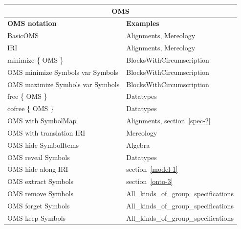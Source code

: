 \documentclass[10pt,fleqn,final]{scrreprt}
\begin{document}
\begin{tabular}{|l|l|}\hline
\multicolumn{2}{|c|}{\textbf{OMS}}\\\hline
\textbf{OMS notation} & \textbf{Examples} \\\hline
BasicOMS  & Alignments, Mereology \\\hline
IRI  & Alignments, Mereology \\\hline
minimize \{ OMS \}  & BlocksWithCircumscription \\\hline
OMS minimize Symbols var Symbols  & BlocksWithCircumscription \\\hline
OMS maximize Symbols var Symbols  & BlocksWithCircumscription \\\hline
free \{ OMS \} & Datatypes \\\hline
cofree \{ OMS \} & Datatypes \\\hline
OMS with SymbolMap  & Alignments,  section~\ref{spec-2} \\\hline
OMS with translation IRI  & Mereology \\\hline
OMS hide SymbolItems  &  Algebra \\\hline
OMS reveal Symbols  & Datatypes \\\hline
OMS hide along IRI  & section~\ref{model-1} \\\hline
OMS extract Symbols  & section~\ref{onto-3} \\\hline
OMS remove Symbols  & All\_kinds\_of\_group\_specifications \\\hline
OMS forget Symbols  & All\_kinds\_of\_group\_specifications \\\hline
OMS keep Symbols  & All\_kinds\_of\_group\_specifications \\\hline

\end{tabular}
\end{document}
